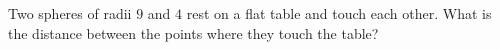 Two spheres of radii $9$ and $4$ rest on a flat table and touch each other. What is the distance between the points where they touch the table?
